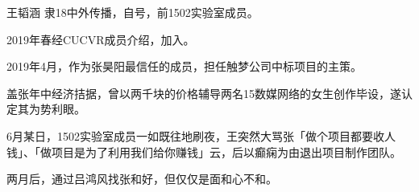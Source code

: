 \begin{section}{王韬涵}
	\label{person:王韬涵}
	隶18中外传播，自号，前1502实验室成员。

	2019年春经CUCVR成员介绍，加入。

	2019年4月，作为张昊阳最信任的成员，担任触梦公司中标项目的主策。

	盖张年中经济拮据，曾以两千块的价格辅导两名15数媒网络的女生创作毕设，遂认定其为势利眼。

	6月某日，1502实验室成员一如既往地刷夜，王突然大骂张「做个项目都要收人钱」、「做项目是为了利用我们给你赚钱」云，后以癫痫为由退出项目制作团队。

	两月后，通过吕鸿风找张和好，但仅仅是面和心不和。
\end{section}